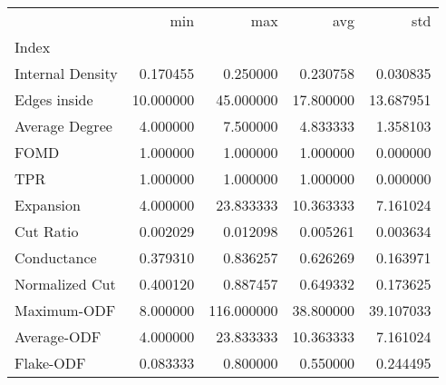 \begin{tabular}{lrrrr}
\toprule
{} &        min &         max &        avg &        std \\
Index            &            &             &            &            \\
\midrule
Internal Density &   0.170455 &    0.250000 &   0.230758 &   0.030835 \\
Edges inside     &  10.000000 &   45.000000 &  17.800000 &  13.687951 \\
Average Degree   &   4.000000 &    7.500000 &   4.833333 &   1.358103 \\
FOMD             &   1.000000 &    1.000000 &   1.000000 &   0.000000 \\
TPR              &   1.000000 &    1.000000 &   1.000000 &   0.000000 \\
Expansion        &   4.000000 &   23.833333 &  10.363333 &   7.161024 \\
Cut Ratio        &   0.002029 &    0.012098 &   0.005261 &   0.003634 \\
Conductance      &   0.379310 &    0.836257 &   0.626269 &   0.163971 \\
Normalized Cut   &   0.400120 &    0.887457 &   0.649332 &   0.173625 \\
Maximum-ODF      &   8.000000 &  116.000000 &  38.800000 &  39.107033 \\
Average-ODF      &   4.000000 &   23.833333 &  10.363333 &   7.161024 \\
Flake-ODF        &   0.083333 &    0.800000 &   0.550000 &   0.244495 \\
\bottomrule
\end{tabular}
